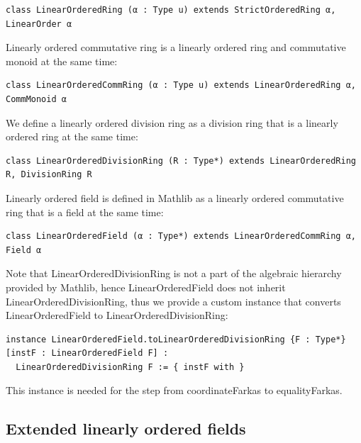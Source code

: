 \documentclass[]{article}
\renewcommand{\.}{\hskip .75pt}
\begin{document}
\begin{lstlisting}
class LinearOrderedRing (α : Type u) extends StrictOrderedRing α, LinearOrder α
\end{lstlisting}
Linearly ordered commutative ring is a linearly ordered ring and commutative monoid at the same time:
\begin{lstlisting}
class LinearOrderedCommRing (α : Type u) extends LinearOrderedRing α, CommMonoid α
\end{lstlisting}
We define a linearly ordered division ring as a division ring that is a linearly ordered ring at the same time:
\begin{lstlisting}
class LinearOrderedDivisionRing (R : Type*) extends LinearOrderedRing R, DivisionRing R
\end{lstlisting}
Linearly ordered field is defined in Mathlib as a linearly ordered commutative ring that is a field at the same time:
\begin{lstlisting}
class LinearOrderedField (α : Type*) extends LinearOrderedCommRing α, Field α
\end{lstlisting}
Note that LinearOrderedDivisionRing is not a part of the algebraic hierarchy provided by Mathlib,
hence LinearOrderedField does not inherit LinearOrderedDivisionRing, thus we provide a custom
instance that converts LinearOrderedField to LinearOrderedDivisionRing:
\begin{lstlisting}
instance LinearOrderedField.toLinearOrderedDivisionRing {F : Type*} [instF : LinearOrderedField F] :
  LinearOrderedDivisionRing F := { instF with }
\end{lstlisting}
This instance is needed for the step from coordinateFarkas to equalityFarkas.

\subsection{Extended linearly ordered fields}
\end{document}
